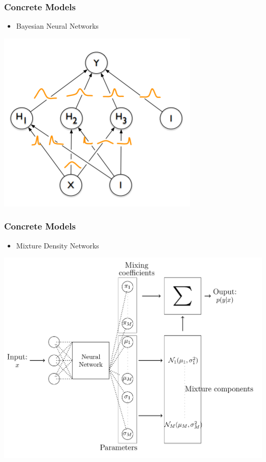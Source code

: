 \documentclass[18pt]{beamer}
\begin{document}
\begin{frame}
  \frametitle{Concrete Models}
  
  \begin{itemize}
  \item Bayesian Neural Networks
  \end{itemize}
  \begin{center}
    \includegraphics[scale=0.5]{images/bnn}
  \end{center}
  
\end{frame}

\begin{frame}
  \frametitle{Concrete Models}
  
   \begin{itemize}
   \item Mixture Density Networks
   \end{itemize}

   \begin{center}
     \includegraphics[scale=0.15]{images/mdn}
   \end{center}
  
 \end{frame}
\end{document}
